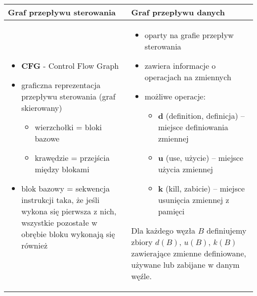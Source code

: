\documentclass[../main.tex]{subfiles}
\begin{document}
    \begin{table}[H]
        \begin{center}
            \begin{tabular}{p{8cm} | p{8cm}}
                \textbf{Graf przepływu sterowania} &  \textbf{Graf przepływu danych}\\
                \hline
                \hline
                \begin{itemize}
                    \item \textbf{CFG} - Control Flow Graph
                    \item graficzna reprezentacja przepływu sterowania (graf skierowany)
                    \begin{itemize}
                        \item wierzchołki = bloki bazowe
                        \item krawędzie = przejścia między blokami
                    \end{itemize}
                    \item blok bazowy = sekwencja instrukcji taka, że jeśli wykona się
                    pierwsza z nich, wszystkie pozostałe w obrębie bloku wykonają się również
                \end{itemize}
                &
                \begin{itemize}
                    \item oparty na grafie przepływ sterowania
                    \item zawiera informacje o operacjach na zmiennych
                    \item możliwe operacje:
                    \begin{itemize}
                        \item \textbf{d} (definition, definicja) – miejsce definiowania zmiennej
                        \item \textbf{u} (use, użycie) – miejsce użycia zmiennej
                        \item \textbf{k} (kill, zabicie) – miejsce usunięcia zmiennej z pamięci
                    \end{itemize}
                \end{itemize}

                Dla każdego węzła $B$ definiujemy zbiory $d(B)$, $u(B)$, $k(B)$ zawierające zmienne definiowane, używane lub
                zabijane w danym węźle.
                \\
            \end{tabular}
        \end{center}
    \end{table}
\end{document}
